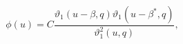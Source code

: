 \begin{equation}
\phi(u)  = 
   C \frac{\vartheta_1(u-\beta,q)
    \vartheta_1(u-\beta^{*},q)}{\vartheta_1^2(u,q)},
\end{equation}

